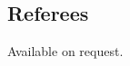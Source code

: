 \documentclass[margin = 0cm,line]{resume}
\begin{document}
\begin{resume}
    \section{\mysidestyle Referees} 

    Available on request.

\end{resume}
\end{document}
